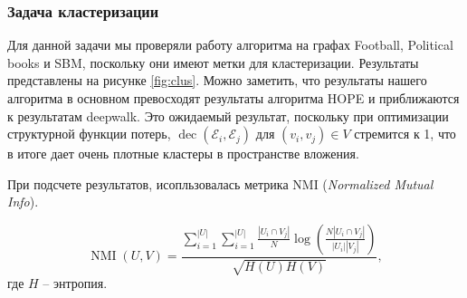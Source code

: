 \documentclass[12pt,a4paper]{extarticle}
\newcommand{\E}{\mathcal{E}}
\newcommand{\decoder}{\operatorname{dec}}
\begin{document}
    \subsubsection{Задача кластеризации}

    Для данной задачи мы проверяли работу алгоритма на графах Football, Political books и SBM, поскольку они имеют метки для кластеризации.
    Результаты представлены на рисунке \ref{fig:clus}.
    Можно заметить, что результаты нашего алгоритма в основном превосходят результаты алгоритма HOPE и приближаются к результатам deepwalk.
    Это ожидаемый результат, поскольку при оптимизации структурной функции потерь, $\decoder(\E_i, \E_j)$ для $(v_i, v_j) \in V$ стремится к 1, что в итоге дает очень плотные кластеры в пространстве вложения.
    
    При подсчете результатов, исопльзовалась метрика NMI (\textit{Normalized Mutual Info}).
    
    \begin{equation}
        \operatorname{NMI} (U, V) = \frac{
            \sum_{i=1}^{|U|} \sum_{i=1}^{|U|} \frac{|U_i \cap V_j|}{N} \log \left( \frac{N |U_i \cap V_j|}{|U_i| |V_j|} \right)
        }{
            \sqrt{H(U)H(V)}
        },
    \end{equation}
    где $H$ -- энтропия.
    
\end{document}
